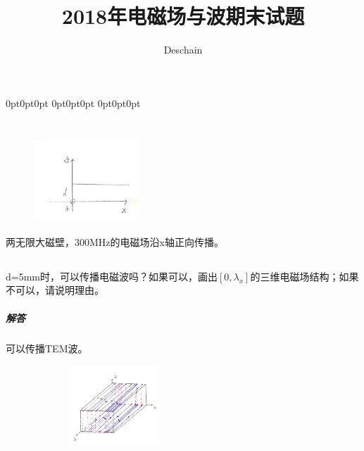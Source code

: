 \documentclass[UTF8]{ctexart}
\title{2018年电磁场与波期末试题}
\author{Deschain}
\begin{document}
\titlespacing*{\subsection}
{0pt}{0pt}{0pt}
\titlespacing*{\paragraph}
{0pt}{0pt}{0pt}
\titlespacing*{\subparagraph}
{0pt}{0pt}{0pt}
\maketitle
\section{}
\begin{figure}
\includegraphics[width=4cm]{2018-1.jpg}
\end{figure}
\paragraph{}
两无限大磁壁，300MHz的电磁场沿x轴正向传播。
\subsection{}
\paragraph{}
d=5mm时，可以传播电磁波吗？如果可以，画出$[0,\lambda_x]$的三维电磁场结构；如果不可以，请说明理由。
\subparagraph{解答}
可以传播TEM波。
\begin{figure}[htbp]
\centering
\includegraphics[width=6cm,height=3cm]{2018-2.jpg}
\end{figure}
\subsection{}
\end{document}

